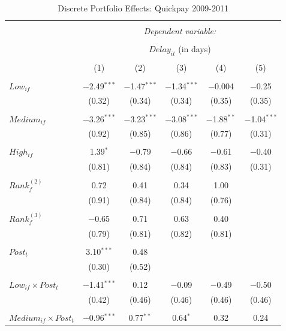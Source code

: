 \documentclass[
]{article}
\begin{document}
\begin{table}[H] \centering 
  \caption{Discrete Portfolio Effects: Quickpay 2009-2011} 
  \label{} 
\small 
\begin{tabular}{@{\extracolsep{-2pt}}lccccc} 
\\[-1.8ex]\hline 
\hline \\[-1.8ex] 
 & \multicolumn{5}{c}{\textit{Dependent variable:}} \\ 
\cline{2-6} 
\\[-1.8ex] & \multicolumn{5}{c}{$Delay_{it}$ (in days)} \\ 
\\[-1.8ex] & (1) & (2) & (3) & (4) & (5)\\ 
\hline \\[-1.8ex] 
 $Low_{if}$ & $-$2.49$^{***}$ & $-$1.47$^{***}$ & $-$1.34$^{***}$ & $-$0.004 & $-$0.25 \\ 
  & (0.32) & (0.34) & (0.34) & (0.35) & (0.35) \\ 
  & & & & & \\ 
 $Medium_{if}$ & $-$3.26$^{***}$ & $-$3.23$^{***}$ & $-$3.08$^{***}$ & $-$1.88$^{**}$ & $-$1.04$^{***}$ \\ 
  & (0.92) & (0.85) & (0.86) & (0.77) & (0.31) \\ 
  & & & & & \\ 
 $High_{if}$ & 1.39$^{*}$ & $-$0.79 & $-$0.66 & $-$0.61 & $-$0.40 \\ 
  & (0.81) & (0.84) & (0.84) & (0.83) & (0.31) \\ 
  & & & & & \\ 
 $Rank_f^{(2)}$ & 0.72 & 0.41 & 0.34 & 1.00 &  \\ 
  & (0.91) & (0.84) & (0.84) & (0.76) &  \\ 
  & & & & & \\ 
 $Rank_f^{(3)}$ & $-$0.65 & 0.71 & 0.63 & 0.40 &  \\ 
  & (0.79) & (0.81) & (0.82) & (0.81) &  \\ 
  & & & & & \\ 
 $Post_t$ & 3.10$^{***}$ & 0.48 &  &  &  \\ 
  & (0.30) & (0.52) &  &  &  \\ 
  & & & & & \\ 
 $Low_{if} \times Post_t$ & $-$1.41$^{***}$ & 0.12 & $-$0.09 & $-$0.49 & $-$0.50 \\ 
  & (0.42) & (0.46) & (0.46) & (0.46) & (0.46) \\ 
  & & & & & \\ 
 $Medium_{if} \times Post_t$ & $-$0.96$^{***}$ & 0.77$^{**}$ & 0.64$^{*}$ & 0.32 & 0.24 \\ 

\end{tabular}
\end{table}
\end{document}
